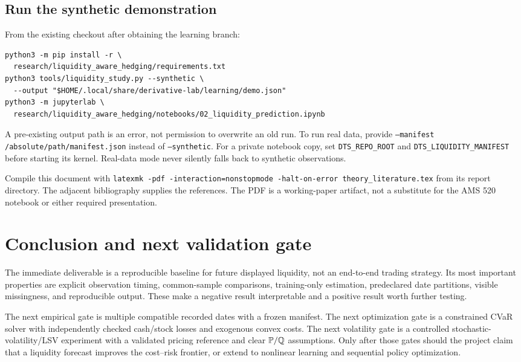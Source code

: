 \subsection{Run the synthetic demonstration}
From the existing checkout after obtaining the learning branch:
\begin{verbatim}
python3 -m pip install -r \
  research/liquidity_aware_hedging/requirements.txt
python3 tools/liquidity_study.py --synthetic \
  --output "$HOME/.local/share/derivative-lab/learning/demo.json"
python3 -m jupyterlab \
  research/liquidity_aware_hedging/notebooks/02_liquidity_prediction.ipynb
\end{verbatim}
A pre-existing output path is an error, not permission to overwrite an old run. To run real data, provide \texttt{--manifest /absolute/path/manifest.json} instead of \texttt{--synthetic}. For a private notebook copy, set \texttt{DTS\_REPO\_ROOT} and \texttt{DTS\_LIQUIDITY\_MANIFEST} before starting its kernel. Real-data mode never silently falls back to synthetic observations.

Compile this document with \texttt{latexmk -pdf -interaction=nonstopmode -halt-on-error theory\_literature.tex} from its report directory. The adjacent bibliography supplies the references. The PDF is a working-paper artifact, not a substitute for the AMS 520 notebook or either required presentation.

\section{Conclusion and next validation gate}
The immediate deliverable is a reproducible baseline for future displayed liquidity, not an end-to-end trading strategy. Its most important properties are explicit observation timing, common-sample comparisons, training-only estimation, predeclared date partitions, visible missingness, and reproducible output. These make a negative result interpretable and a positive result worth further testing.

The next empirical gate is multiple compatible recorded dates with a frozen manifest. The next optimization gate is a constrained CVaR solver with independently checked cash/stock losses and exogenous convex costs. The next volatility gate is a controlled stochastic-volatility/LSV experiment with a validated pricing reference and clear $\mathbb P/\mathbb Q$ assumptions. Only after those gates should the project claim that a liquidity forecast improves the cost--risk frontier, or extend to nonlinear learning and sequential policy optimization.


